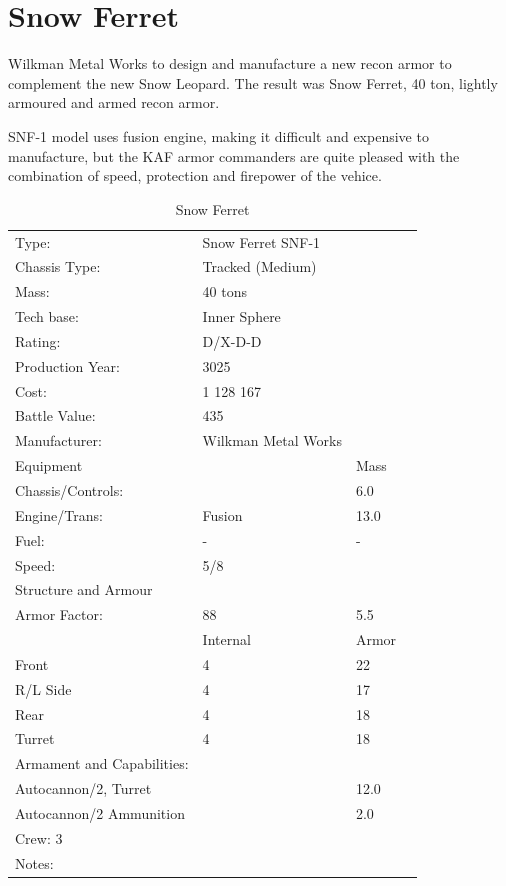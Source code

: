 \documentclass{tufte-book}
\begin{document}
\section{Snow Ferret}

 Wilkman Metal Works to design and manufacture a
new recon armor to complement the new Snow Leopard. The result was Snow
Ferret, 40 ton, lightly armoured and armed recon armor.

SNF-1 model uses fusion engine, making it difficult and expensive to
manufacture, but the KAF armor commanders are quite pleased with the
combination of speed, protection and firepower of the vehice.

\bigskip
\begin{table}
\begin{minipage}{\textwidth}
\begin{center}
\begin{tabular}{llll}
\toprule
Type: & Snow Ferret SNF-1 & \\
Chassis Type: & Tracked (Medium) & \\
Mass: & 40 tons & \\
Tech base: & Inner Sphere & \\
Rating: & D/X-D-D & \\
Production Year: & 3025 & \\
Cost: & 1 128 167 & \\
Battle Value: & 435 & \\
Manufacturer: & Wilkman Metal Works & \\
Equipment & & Mass \\
\quad Chassis/Controls: & & 6.0 \\
\quad Engine/Trans: & Fusion & 13.0 \\
\quad Fuel: & - & - \\
\quad Speed: & \multicolumn{2}{l}{5/8} \\
Structure and Armour & & \\
\quad Armor Factor: & 88 & 5.5 \\
\quad & Internal & Armor \\
\quad Front & 4 & 22 \\
\quad R/L Side & 4 & 17 \\
\quad Rear & 4 & 18 \\
\quad Turret & 4 & 18 \\

Armament and Capabilities: & & \\
\multicolumn{2}{l}{\quad 2 Autocannon/2, Turret} & 12.0 \\
\multicolumn{2}{l}{\quad Autocannon/2 Ammunition} & 2.0 \\


\multicolumn{3}{l}{Crew: 3} \\

Notes: & & \\


\bottomrule
\end{tabular}
\end{center}
\end{minipage}
\caption{Snow Ferret}
\end{table}
\end{document}
